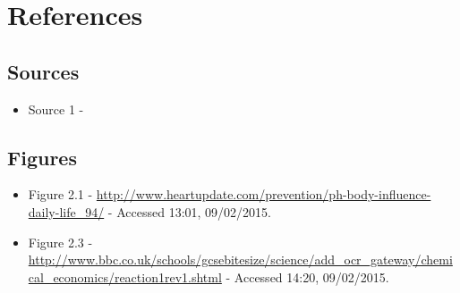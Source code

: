 \chapter{References}

\section{Sources}

\begin{itemize}
\item Source 1 - 
\end{itemize}

\section{Figures}
\begin{itemize}
\item Figure 2.1 - \url{http://www.heartupdate.com/prevention/ph-body-influence-daily-life_94/} - Accessed 13:01, 09/02/2015. 
\item Figure 2.3 - \url{http://www.bbc.co.uk/schools/gcsebitesize/science/add_ocr_gateway/chemical_economics/reaction1rev1.shtml} - Accessed 14:20, 09/02/2015.
\end{itemize}